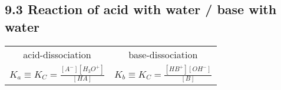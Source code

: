 \subsection{9.3 Reaction of acid with water / base with water}
    \begin{tabular}{c c}
        acid-dissociation & base-dissociation\\
        $K_a \equiv K_C = \frac{[A^-] [H_3O^+]}{[HA]}$ & $K_b \equiv K_C = \frac{[HB^+] [OH^-]}{[B]}$
    \end{tabular}